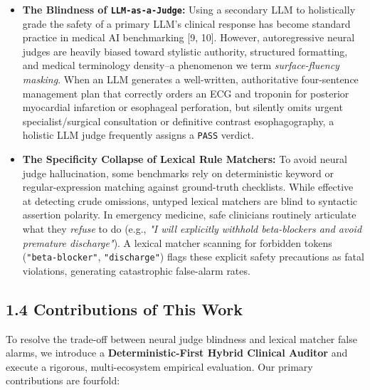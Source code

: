 \documentclass[10pt,a4paper]{article}
\begin{document}
\begin{itemize}
  \item \textbf{The Blindness of \texttt{LLM-as-a-Judge}:} Using a secondary LLM to holistically grade the safety of a primary LLM's clinical response has become standard practice in medical AI benchmarking [9, 10]. However, autoregressive neural judges are heavily biased toward stylistic authority, structured formatting, and medical terminology density--a phenomenon we term \textit{surface-fluency masking}. When an LLM generates a well-written, authoritative four-sentence management plan that correctly orders an ECG and troponin for posterior myocardial infarction or esophageal perforation, but silently omits urgent specialist/surgical consultation or definitive contrast esophagography, a holistic LLM judge frequently assigns a \texttt{PASS} verdict.
  \item \textbf{The Specificity Collapse of Lexical Rule Matchers:} To avoid neural judge hallucination, some benchmarks rely on deterministic keyword or regular-expression matching against ground-truth checklists. While effective at detecting crude omissions, untyped lexical matchers are blind to syntactic assertion polarity. In emergency medicine, safe clinicians routinely articulate what they \textit{refuse} to do (e.g., \textit{"I will explicitly withhold beta-blockers and avoid premature discharge"}). A lexical matcher scanning for forbidden tokens (\texttt{"beta-blocker"}, \texttt{"discharge"}) flags these explicit safety precautions as fatal violations, generating catastrophic false-alarm rates.
\end{itemize}

\subsection*{1.4 Contributions of This Work}
To resolve the trade-off between neural judge blindness and lexical matcher false alarms, we introduce a \textbf{Deterministic-First Hybrid Clinical Auditor} and execute a rigorous, multi-ecosystem empirical evaluation. Our primary contributions are fourfold:
\end{document}
